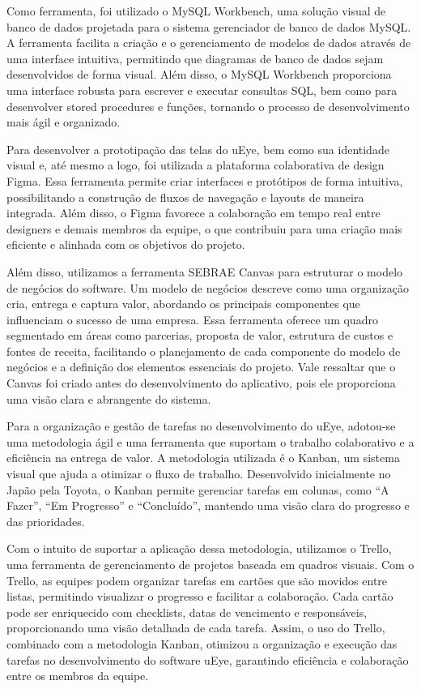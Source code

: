 Como ferramenta, foi utilizado o MySQL Workbench, uma solução visual de banco de dados projetada para o sistema gerenciador de banco de dados MySQL. A ferramenta facilita a criação e o gerenciamento de modelos de dados através de uma interface intuitiva, permitindo que diagramas de banco de dados sejam desenvolvidos de forma visual. Além disso, o MySQL Workbench proporciona uma interface robusta para escrever e executar consultas SQL, bem como para desenvolver stored procedures e funções, tornando o processo de desenvolvimento mais ágil e organizado. \textcite{DNC}

Para desenvolver a prototipação das telas do uEye, bem como sua identidade visual e, até mesmo a logo, foi utilizada a plataforma colaborativa de design Figma. Essa ferramenta permite criar interfaces e protótipos de forma intuitiva, possibilitando a construção de fluxos de navegação e layouts de maneira integrada. Além disso, o Figma favorece a colaboração em tempo real entre designers e demais membros da equipe, o que contribuiu para uma criação mais eficiente e alinhada com os objetivos do projeto.  \textcite{Alura}

Além disso, utilizamos a ferramenta SEBRAE Canvas para estruturar o modelo de negócios do software. Um modelo de negócios descreve como uma organização cria, entrega e captura valor, abordando os principais componentes que influenciam o sucesso de uma empresa. Essa ferramenta oferece um quadro segmentado em áreas como parcerias, proposta de valor, estrutura de custos e fontes de receita, facilitando o planejamento de cada componente do modelo de negócios e a definição dos elementos essenciais do projeto. Vale ressaltar que o Canvas foi criado antes do desenvolvimento do aplicativo, pois ele proporciona uma visão clara e abrangente do sistema.

Para a organização e gestão de tarefas no desenvolvimento do uEye, adotou-se uma metodologia ágil e uma ferramenta que suportam o trabalho colaborativo e a eficiência na entrega de valor. A metodologia utilizada é o Kanban, um sistema visual que ajuda a otimizar o fluxo de trabalho. Desenvolvido inicialmente no Japão pela Toyota, o Kanban permite gerenciar tarefas em colunas, como “A Fazer”, “Em Progresso” e “Concluído”, mantendo uma visão clara do progresso e das prioridades. \textcite{TOTVS}

Com o intuito de suportar a aplicação dessa metodologia, utilizamos o Trello, uma ferramenta de gerenciamento de projetos baseada em quadros visuais. Com o Trello, as equipes podem organizar tarefas em cartões que são movidos entre listas, permitindo visualizar o progresso e facilitar a colaboração. Cada cartão pode ser enriquecido com checklists, datas de vencimento e responsáveis, proporcionando uma visão detalhada de cada tarefa. Assim, o uso do Trello, combinado com a metodologia Kanban, otimizou a organização e execução das tarefas no desenvolvimento do software uEye, garantindo eficiência e colaboração entre os membros da equipe. \textcite{Magalhães}